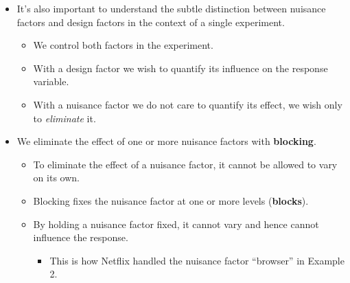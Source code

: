 \begin{itemize}
      \item It's also important to understand the subtle distinction between nuisance factors and design factors in
            the context of a single experiment.
            \begin{itemize}
                  \item We control both factors in the experiment.
                  \item With a design factor we wish to quantify its influence on the response variable.
                  \item With a nuisance factor we do not care to quantify its effect, we wish only to \emph{eliminate} it.
            \end{itemize}
      \item We eliminate the effect of one or more nuisance factors with \textbf{blocking}.
            \begin{itemize}
                  \item To eliminate the effect of a nuisance factor, it cannot be allowed to vary on its own.
                  \item Blocking fixes the nuisance factor at one or more levels (\textbf{blocks}).
                  \item By holding a nuisance factor fixed, it cannot vary and hence cannot influence the response.
                        \begin{itemize}
                              \item This is how Netflix handled the nuisance factor ``browser'' in Example 2.
                        \end{itemize}
            \end{itemize}
\end{itemize}
